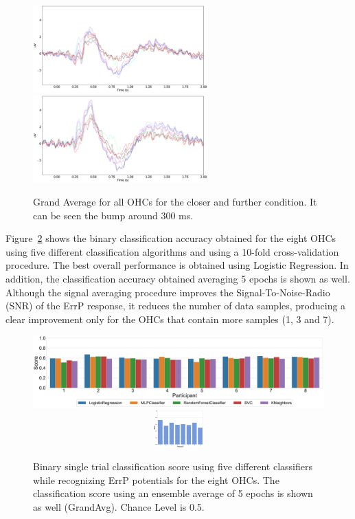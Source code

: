 \documentclass[journal]{IEEEtran}
\begin{document}
{{\begin{figure}[ht]
    \centering
    \includegraphics[width=0.6\textwidth]{revisedimages/avg_closer.eps}
    \includegraphics[width=0.6\textwidth]{revisedimages/avg_further.eps}
    \caption{Grand Average for all OHCs for the closer and further condition.  It can be seen the bump around 300 ms.}
    \label{fig:classifiers}
\end{figure}

Figure~\ref{fig:classifiers} shows the binary classification accuracy obtained for the eight OHCs using five different classification algorithms and using a 10-fold cross-validation procedure.  The best overall performance is obtained using Logistic Regression.  In addition, the classification accuracy obtained averaging 5 epochs is shown as well.  Although the signal averaging procedure improves the Signal-To-Noise-Radio (SNR) of the ErrP response, it reduces the number of data samples, producing a clear improvement only for the OHCs that contain more samples (1, 3 and 7).

\begin{figure}[ht]
    \centering
    \includegraphics[scale=0.11]{revisedimages/cross_val.eps}
    \includegraphics[height=40pt,width=1.20\textwidth]{revisedimages/avg_5_segments.eps}
    \caption{Binary single trial classification score using five different classifiers while recognizing ErrP potentials for the eight OHCs.  The classification score using an ensemble average of 5 epochs is shown as well (GrandAvg). Chance Level is 0.5.}
    \label{fig:classifiers}
\end{figure}


}}
\end{document}
